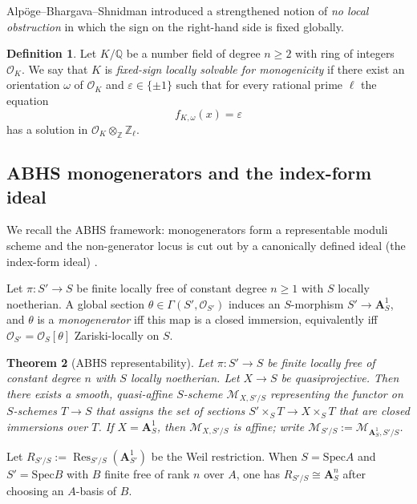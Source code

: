 \documentclass[11pt,letterpaper]{amsart}
\newcommand{\Z}{\mathbb{Z}}
\newcommand{\Q}{\mathbb{Q}}
\newcommand{\Res}{\operatorname{Res}}
\newcommand{\A}{\mathbf{A}}
\newcommand{\Spec}{\mathrm{Spec}}
\newcommand{\OO}{\mathcal{O}}
\newcommand{\cM}{\mathcal{M}}
\theoremstyle{plain}
\newtheorem{theorem}{Theorem}[section]
\theoremstyle{definition}
\newtheorem{definition}[theorem]{Definition}
\theoremstyle{remark}
\theoremstyle{plain}
\begin{document}
Alp\"oge--Bhargava--Shnidman introduced a strengthened notion of \emph{no local obstruction} in which the sign on the right-hand side is fixed globally.

\begin{definition}\label{def:ABS}
Let $K/\Q$ be a number field of degree $n\ge 2$ with ring of integers $\OO_K$.
We say that $K$ is \emph{fixed-sign locally solvable for monogenicity} if there exist an orientation
$\omega$ of $\OO_K$ and $\varepsilon\in\{\pm1\}$ such that for every rational prime $\ell$ the equation
\[
f_{K,\omega}(x)=\varepsilon
\]
has a solution in $\OO_K\otimes_{\Z}\Z_\ell$.
\end{definition}


\subsection{ABHS monogenerators and the index-form ideal}
\label{sec:ABHS}

We recall the ABHS framework: monogenerators form a representable moduli scheme and the non-generator
locus is cut out by a canonically defined ideal (the index-form ideal) \cite{ABHS-I,ABHS-II}.

Let $\pi:S'\to S$ be finite locally free of constant degree $n\ge 1$ with $S$ locally noetherian.
A global section $\theta\in \Gamma(S',\OO_{S'})$ induces an $S$-morphism $S'\to \A^1_S$,
and $\theta$ is a \emph{monogenerator} iff this map is a closed immersion, equivalently iff
$\OO_{S'}=\OO_S[\theta]$ Zariski-locally on $S$.

\begin{theorem}[ABHS representability]\label{thm:ABHS-rep}
Let $\pi:S'\to S$ be finite locally free of constant degree $n$ with $S$ locally noetherian.
Let $X\to S$ be quasiprojective.
Then there exists a smooth, quasi-affine $S$-scheme $\cM_{X,S'/S}$ representing the functor on
$S$-schemes $T\to S$ that assigns the set of sections $S'\times_S T \to X\times_S T$
that are closed immersions over $T$.
If $X=\A^1_S$, then $\cM_{X,S'/S}$ is affine; write $\cM_{S'/S}:=\cM_{\A^1_S,S'/S}$.
\end{theorem}

Let $R_{S'/S}:=\Res_{S'/S}(\A^1_{S'})$ be the Weil restriction.
When $S=\Spec A$ and $S'=\Spec B$ with $B$ finite free of rank $n$ over $A$, one has
$R_{S'/S}\cong \A^n_S$ after choosing an $A$-basis of $B$.
\end{document}
